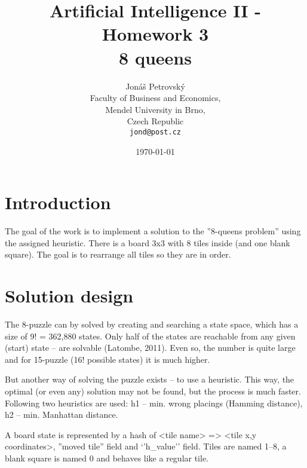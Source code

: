 \documentclass[a4paper]{article}
\begin{document}
\title{\vspace{-1.0cm}Artificial Intelligence II - Homework 3 \\ \textbf{8 queens}}
\author{Jonáš Petrovský\\
        Faculty of Business and Economics,\\
		Mendel University in Brno,\\
		Czech Republic \\
		\texttt{jond@post.cz}}
\date{\today}
\maketitle

\section{Introduction}
The goal of the work is to implement a solution to the ''8-queens problem'' using the assigned heuristic. There is a board 3x3 with 8 tiles inside (and one blank square). The goal is to rearrange all tiles so they are in order.

\section{Solution design}
The 8-puzzle can by solved by creating and searching a state space, which has a size of 9! = 362,880 states. Only half of the states are reachable from any given (start) state -- are solvable (Latombe, 2011). Even so, the number is quite large and for 15-puzzle (16! possible states) it is much higher. 

But another way of solving the puzzle exists -- to use a heuristic. This way, the optimal (or even any) solution may not be found, but the process is much faster. Following two heuristics are used: h1 -- min. wrong placings (Hamming distance), h2 -- min. Manhattan distance.

A board state is represented by a hash of <tile name> => <tile x,y coordinates>, ''moved tile'' field and `'h\_value'' field. Tiles are named 1--8, a blank square is named 0 and behaves like a regular tile. 
\end{document}
